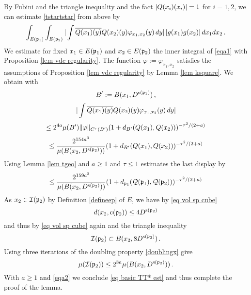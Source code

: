By Fubini and the triangle inequality and
the fact $|{Q}(x_i)(x_i)|=1$ for $i=1,2$, we can estimate
\eqref{tstartstar} from above by
\begin{equation}\label{eqa1}
\int_{E(\mathfrak p_1)} \int_{E(\mathfrak p_2)} |\int
\overline{{Q}(x_1)(y)}{{Q}(x_2)(y)}\varphi_{x_1,x_2}(y)
\,dy|\,|g(x_1)g(x_2)|\, dx_1dx_2\,.
\end{equation}
We estimate for fixed $x_1\in E(\mathfrak p_1)$ and
$x_2\in E(\mathfrak p_2)$ the inner integral of \eqref{eqa1} with
Proposition \ref{lem vdc regularity}. The function
$\varphi:=\varphi_{x_1,x_2}$ satisfies the assumptions of
Proposition \ref{lem vdc regularity} by Lemma \ref{lem ksquare}.
We obtain with
\begin{equation}
    B':= B(x_1, D^{\mathrm{s}(\mathfrak p_1)})\, ,
\end{equation}
\begin{equation}
    |\int
\overline{{Q}(x_1)(y)}{{Q}(x_2)(y)}\varphi_{x_1,x_2}(y)
\,dy|
\end{equation}
\begin{equation}
 \le     2^{4a} \mu(B') \|{\varphi}\|_{C^\tau(B')}
       (1 + d_{B'}({Q}(x_1),{Q}(x_2)))^{-\tau^2/(2+a)}
\end{equation}
\begin{equation}
 \le     \frac{2^{154a^3}}
 {\mu(B(x_2, D^{\mathrm{s}(\mathfrak p_2)}))}
       (1 + d_{B'}({Q}(x_1),{Q}(x_2)))^{-\tau^2/(2+a)}
\end{equation}
Using Lemma \ref{lem tgeo} and $a\ge 1$ and $\tau \le 1$ estimates the last display by
\begin{equation}\label{eqa2}
 \le     \frac{2^{159a^3}}
 {\mu(B(x_2, D^{\mathrm{s}(\mathfrak p_2)}))}
       (1+d_{\mathfrak p_1}(\mathcal{Q}(\mathfrak p_1), \mathcal{Q}(\mathfrak p_2)))^{-\tau^2/(2+a)}
\end{equation}
As $x_2\in \mathcal{I}(\mathfrak p_2)$ by Definition \eqref{defineep} of $E$, we have by \eqref{eq vol sp cube}
\begin{equation}
    d(x_2,\mathrm{c}(\mathfrak p_2))\le 4D^{\mathrm{s}(\mathfrak p_2)}
\end{equation}
and thus by \eqref{eq vol sp cube} again and the triangle inequality
\begin{equation}
    \mathcal{I}(\mathfrak p_2)\subset B(x_2,8D^{\mathrm{s}(\mathfrak p_2)})\, .
\end{equation}
Using three iterations of the doubling property \eqref{doublingx} give
\begin{equation}
    \mu(\mathcal{I}(\mathfrak p_2))\le 2^{3a}\mu(B(x_2,D^{\mathrm{s}(\mathfrak p_2)}))\, .
\end{equation}
With $a\ge 1$ and \eqref{eqa2} we conclude \eqref{eq basic TT* est} and thus complete the proof of the lemma.


